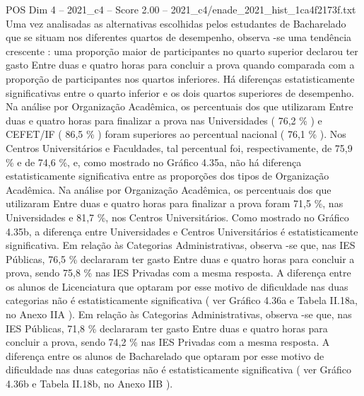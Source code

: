 \begin{textsample}{POS Dim 4 – 2021\_c4 – Score 2.00 – 2021\_c4/enade\_2021\_hist\_1ca4f2173f.txt}
Uma vez analisadas as alternativas escolhidas pelos estudantes de Bacharelado que se situam nos diferentes quartos de desempenho, observa -se uma tendência crescente : uma proporção maior de participantes no quarto superior declarou ter gasto Entre duas e quatro horas para concluir a prova quando comparada com a proporção de participantes nos quartos inferiores.
Há diferenças estatisticamente significativas entre o quarto inferior e os dois quartos superiores de desempenho.
Na análise por Organização Acadêmica, os percentuais dos que utilizaram Entre duas e quatro horas para finalizar a prova nas Universidades ( 76,2 \% ) e CEFET/IF ( 86,5 \% ) foram superiores ao percentual nacional ( 76,1 \% ).
Nos Centros Universitários e Faculdades, tal percentual foi, respectivamente, de 75,9 \% e de 74,6 \%, e, como mostrado no Gráfico 4.35a, não há diferença estatisticamente significativa entre as proporções dos tipos de Organização Acadêmica.
Na análise por Organização Acadêmica, os percentuais dos que utilizaram Entre duas e quatro horas para finalizar a prova foram 71,5 \%, nas Universidades e 81,7 \%, nos Centros Universitários.
Como mostrado no Gráfico 4.35b, a diferença entre Universidades e Centros Universitários é estatisticamente significativa.
Em relação às Categorias Administrativas, observa -se que, nas IES Públicas, 76,5 \% declararam ter gasto Entre duas e quatro horas para concluir a prova, sendo 75,8 \% nas IES Privadas com a mesma resposta.
A diferença entre os alunos de Licenciatura que optaram por esse motivo de dificuldade nas duas categorias não é estatisticamente significativa ( ver Gráfico 4.36a e Tabela II.18a, no Anexo IIA ).
Em relação às Categorias Administrativas, observa -se que, nas IES Públicas, 71,8 \% declararam ter gasto Entre duas e quatro horas para concluir a prova, sendo 74,2 \% nas IES Privadas com a mesma resposta.
A diferença entre os alunos de Bacharelado que optaram por esse motivo de dificuldade nas duas categorias não é estatisticamente significativa ( ver Gráfico 4.36b e Tabela II.18b, no Anexo IIB ).

\end{textsample}
